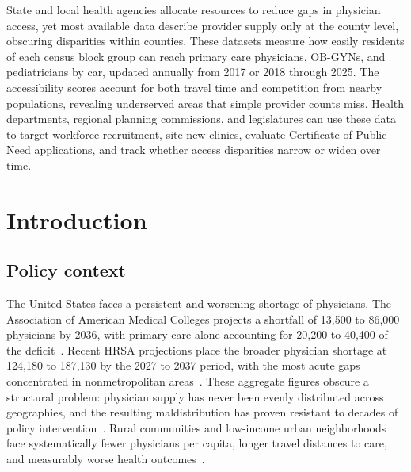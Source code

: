 \documentclass{CUP-JNL-DAP}%
\begin{document}
\begin{Frontmatter}
\begin{policy}
State and local health agencies allocate resources to reduce gaps in physician access, yet most available data describe provider supply only at the county level, obscuring disparities within counties. These datasets measure how easily residents of each census block group can reach primary care physicians, OB-GYNs, and pediatricians by car, updated annually from 2017 or 2018 through 2025. The accessibility scores account for both travel time and competition from nearby populations, revealing underserved areas that simple provider counts miss. Health departments, regional planning commissions, and legislatures can use these data to target workforce recruitment, site new clinics, evaluate Certificate of Public Need applications, and track whether access disparities narrow or widen over time.
\end{policy}

\end{Frontmatter}


\section{Introduction}

\subsection{Policy context}

The United States faces a persistent and worsening shortage of physicians. The Association of American Medical Colleges projects a shortfall of 13,500 to 86,000 physicians by 2036, with primary care alone accounting for 20,200 to 40,400 of the deficit~\citep{aamc2024}. Recent HRSA projections place the broader physician shortage at 124,180 to 187,130 by the 2027 to 2037 period, with the most acute gaps concentrated in nonmetropolitan areas~\citep{adashi2025}. These aggregate figures obscure a structural problem: physician supply has never been evenly distributed across geographies, and the resulting maldistribution has proven resistant to decades of policy intervention~\citep{rosenthal2005}. Rural communities and low-income urban neighborhoods face systematically fewer physicians per capita, longer travel distances to care, and measurably worse health outcomes~\citep{douthit2015}.
\end{document}
